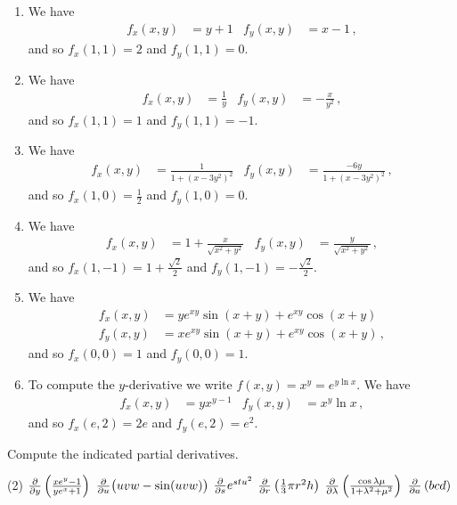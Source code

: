 \begin{solution}
\begin{enumerate}
\item
We have
\begin{align*}
f_x(x,y) &= y +1 &
f_y(x,y) &= x-1\,,
\end{align*}
and so $f_x(1,1) = 2$ and $f_y(1,1) = 0$.
\item
We have
\begin{align*}
f_x(x,y) &= \frac{1}{y} &
f_y(x,y) &= -\frac{x}{y^2}\,,
\end{align*}
and so $f_x(1,1) = 1$ and $f_y(1,1) = -1$.
\item
We have
\begin{align*}
f_x(x,y) &= \frac{1}{1+\left(x-3y^2\right)^2} &
f_y(x,y) &= \frac{-6y}{1+\left(x-3y^2\right)^2}\,,
\end{align*}
and so $f_x(1,0) = \frac 12$ and $f_y(1,0) = 0$.
\item
We have
\begin{align*}
f_x(x,y) &= 1 + \frac{x}{\sqrt{x^2+y^2}} &
f_y(x,y) &= \frac{y}{\sqrt{x^2+y^2}} \,,
\end{align*}
and so $f_x(1,-1) = 1 + \frac{\sqrt{2}}{2}$ and $f_y(1,-1) = -\frac{\sqrt{2}}2$.
\item
We have
\begin{align*}
f_x(x,y) &= y e^{xy} \sin(x+y) + e^{xy} \cos(x+y) \\
f_y(x,y) &= x e^{xy} \sin(x+y) + e^{xy} \cos(x+y)\,,
\end{align*}
and so $f_x(0,0) = 1$ and $f_y(0,0) = 1$.
\item
To compute the $y$-derivative we write $f(x,y) = x^y = e^{y \ln x}$. We have
\begin{align*}
f_x(x,y) &= y x^{y-1} &
f_y(x,y) &= x^y \ln x\,,
\end{align*}
and so $f_x(e, 2) = 2e$ and $f_y(e, 2) = e^2$.
\end{enumerate}
\end{solution}

\begin{question}
Compute the indicated partial derivatives.
\begin{tasks}(2)
\task
$\frac{\partial}{\partial y}\left( \frac{x e^y - 1}{y e^x + 1}\right)$
\task
$\frac{\partial}{\partial u} \big( uvw - \sin(uvw) \big)$
\task
$\frac{\partial}{\partial s} e^{stu^2}$
\task
$\frac{\partial}{\partial r} \left( \frac 13 \pi r^2 h \right)$ 
\task
$\frac{\partial}{\partial \lambda} \left( \frac{\cos \lambda\mu}{1+\lambda^2 + \mu^2} \right)$
\task
$\frac{\partial}{\partial a} \left( bcd \right)$
\end{tasks}
\end{question}

